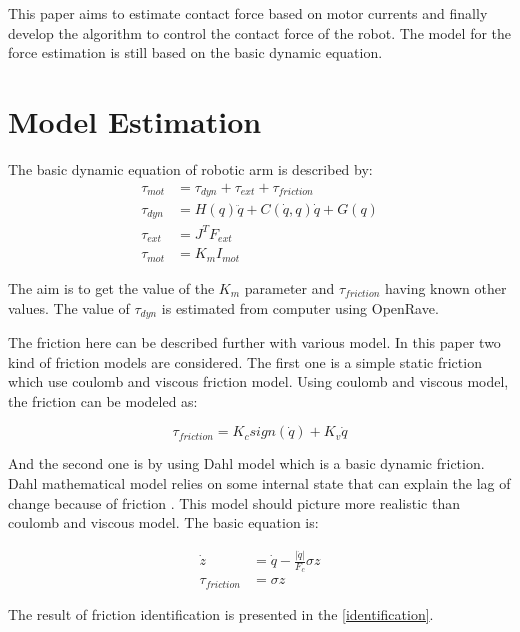 \documentclass[letterpaper, 10 pt, conference]{ieeeconf}
\begin{document}
This paper aims to estimate contact force based on motor currents and finally develop the algorithm to control the contact force of the robot. The model for the force estimation is still based on the basic dynamic equation. 





      \section{Model Estimation}
The basic dynamic equation of robotic arm is described by:
\begin{align}
  \tau_{mot} &= \tau_{dyn} + \tau_{ext} + \tau_{friction}\\
  \tau_{dyn} &= H\left(q\right)\ddot{q} + C\left(\dot{q} , q \right)\dot{q} + G\left(q \right)\\
  \tau_{ext} &= J^{T} F_{ext}\\
  \tau_{mot} &= K_{m} I_{mot}
\end{align}

The aim is to get the value of the $K_{m}$ parameter and $\tau_{friction}$ having known other values. The value of $\tau_{dyn}$ is estimated from computer using OpenRave.

The friction here can be described further with various model. In this paper two kind of friction models are considered. The first one is a simple static friction which use coulomb and viscous friction model. Using coulomb and viscous model, the friction can be modeled as:

\begin{equation}
  \tau_{friction} = K_{c} sign\left(\dot{q}\right) + K_{v} \dot{q}
\end{equation}

And the second one is by using Dahl model which is a basic dynamic friction. Dahl mathematical model relies on some internal state that can explain the lag of change because of friction \cite{Bona05}. This model should picture more realistic than coulomb and viscous model. The basic equation is: 

\begin{align}
  \dot{z} &= \dot{q} - \frac{\left|\dot{q}\right|}{F_{c}} \sigma z \\
  \tau_{friction} &= \sigma z
\end{align}

The result of friction identification is presented in the \ref{identification}.
\end{document}

